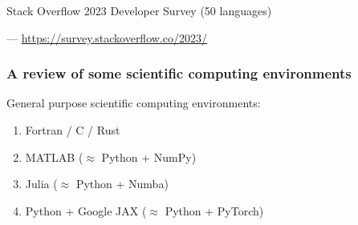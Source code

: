 \documentclass[
    xcolor={svgnames,dvipsnames},
    hyperref={colorlinks, citecolor=DeepPink4, linkcolor=DarkRed, urlcolor=DarkBlue}
    ]{beamer}  %
\newcommand{\1}{\mathbbm 1}
\begin{document}
\begin{frame}

    Stack Overflow 2023 Developer Survey (50 languages)


    \begin{figure}
       \begin{center}
       \end{center}
    \end{figure}
    

    \hspace*{\fill}--- \url{https://survey.stackoverflow.co/2023/}


\end{frame}




\begin{frame}
    \frametitle{A review of some scientific computing environments}


    General purpose scientific computing environments:

        \vspace{0.5em}
        \vspace{0.5em}
    \begin{enumerate}
        \item Fortran / C / Rust
        \vspace{0.5em}
        \vspace{0.5em}
        \item MATLAB ($\approx$ Python + NumPy)
        \vspace{0.5em}
        \vspace{0.5em}
        \item Julia ($\approx$ Python + Numba) 
        \vspace{0.5em}
        \vspace{0.5em}
        \item Python + Google JAX ($\approx$ Python + PyTorch)
    \end{enumerate}

\end{frame}
\end{document}
